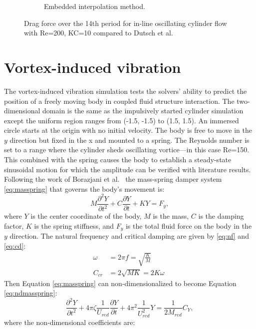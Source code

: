 \begin{figure}[!htb]
\begin{subfigure}{0.4\textwidth}
		\caption{Embedded interpolation method.}
	\end{subfigure}
	\caption{Drag force over the 14th period for in-line oscillating cylinder flow with Re=200, KC=10 compared to Dutsch et al.~\cite{dutsch1998low}}
	\label{fig:KC 10}
\end{figure}
\section{Vortex-induced vibration}
The vortex-induced vibration simulation tests the solvers' ability to predict the position of a freely moving body in coupled fluid structure interaction. 
The two-dimensional domain is the same as the impulsively started cylinder simulation except the uniform region ranges from (-1.5, -1.5) to (1.5, 1.5). 
An immersed circle starts at the origin with no initial velocity. 
The body is free to move in the $y$ direction but fixed in the x and mounted to a spring. 
The Reynolds number is set to a range where the cylinder sheds oscillating vortice---in this case Re=150. 
This combined with the spring causes the body to establish a steady-state sinusoidal motion for which the amplitude can be verified with literature results. 
Following the work of Borazjani et al.~\cite{borazjani2008curvilinear} the mass-spring damper system \eqref{eq:masspring} that governs the body's movement is:
\begin{equation}
M\frac{\partial^2Y}{\partial t^2}+C\frac{\partial Y}{\partial t}+KY=F_y, \label{eq:masspring}
\end{equation}
where $Y$ is the center coordinate of the body, $M$ is the mass, $C$ is the damping factor, $K$ is the spring stiffness, and $F_y$ is the total fluid force on the body in the $y$ direction. 
The natural frequency and critical damping are given by \eqref{eq:nf} and \eqref{eq:cd}: 
\begin{align}
\omega &=2\pi f =\sqrt{\frac{K}{M}}\label{eq:nf}\\
C_{cr}&=2\sqrt{MK}=2K\omega \; \label{eq:cd}
\end{align}
Then Equation \eqref{eq:masspring} can non-dimensionalized to become Equation \eqref{eq:ndmasspring}:
\begin{equation}
\frac{\partial^2 Y}{\partial t^2}+4\pi \zeta\frac{1}{U_{red}}\frac{\partial Y}{\partial t}+4\pi^2\frac{1}{U_{red}^2}Y=\frac{1}{2M_{red}}C_Y,\label{eq:ndmasspring}
\end{equation}
where the non-dimensional coefficients are:\newline
